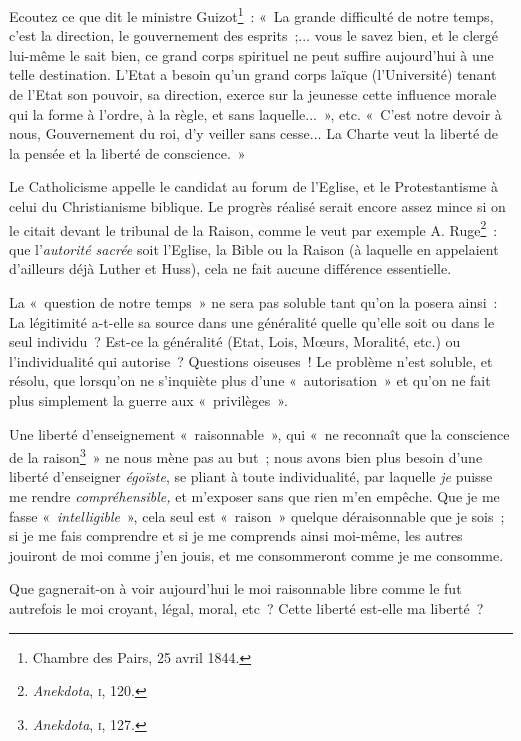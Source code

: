 \documentclass[french,twoside]{book} %
\begin{document}
Ecoutez ce que dit le ministre Guizot\footnote{ \noindent Chambre des Pairs, 25 avril 1844.
 } : « La grande difficulté de notre temps, c’est la direction, le gouvernement des esprits ;... vous le savez bien,  et le clergé lui-même le sait bien, ce grand corps spirituel ne peut suffire aujourd’hui à une telle destination. L’Etat a besoin qu’un grand corps laïque (l’Université) tenant de l’Etat son pouvoir, sa direction, exerce sur la jeunesse cette influence morale qui la forme à l’ordre, à la règle, et sans laquelle... », etc. « C’est notre devoir à nous, Gouvernement du roi, d’y veiller sans cesse... La Charte veut la liberté de la pensée et la liberté de conscience. »\par
Le Catholicisme appelle le candidat au forum de l’Eglise, et le Protestantisme à celui du Christianisme biblique. Le progrès réalisé serait encore assez mince si on le citait devant le tribunal de la Raison, comme le veut par exemple A. Ruge\footnote{ \noindent \emph{Anekdota}, {\scshape i}, 120.
 } : que l’\emph{autorité sacrée }soit l’Eglise, la Bible ou la Raison (à laquelle en appelaient d’ailleurs déjà Luther et Huss), cela ne fait aucune différence essentielle.\par
La « question de notre temps » ne sera pas soluble tant qu’on la posera ainsi : La légitimité a-t-elle sa source dans une généralité quelle qu’elle soit ou dans le seul individu ? Est-ce la généralité (Etat, Lois, Mœurs, Moralité, etc.) ou l’individualité qui autorise ? Questions oiseuses ! Le problème n’est soluble, et résolu, que lorsqu’on ne s’inquiète plus d’une « autorisation » et qu’on ne fait plus simplement la guerre aux « privilèges ».\par
Une liberté d’enseignement « raisonnable », qui « ne reconnaît que la conscience de la raison\footnote{ \noindent \emph{Anekdota}, {\scshape i}, 127.
 } » ne nous mène pas au but ; nous avons bien plus besoin d’une liberté d’enseigner \emph{égoïste}, se pliant à toute individualité, par laquelle \emph{je} puisse me rendre \emph{compréhensible,} et m’exposer sans que rien m’en empêche. Que je me fasse « \emph{intelligible} », cela seul est « raison » quelque déraisonnable que je sois ; si je me  fais comprendre et si je me comprends ainsi moi-même, les autres jouiront de moi comme j’en jouis, et me consommeront comme je me consomme.\par
Que gagnerait-on à voir aujourd’hui le moi raisonnable libre comme le fut autrefois le moi croyant, légal, moral, etc ? Cette liberté est-elle ma liberté ?\par
\end{document}
